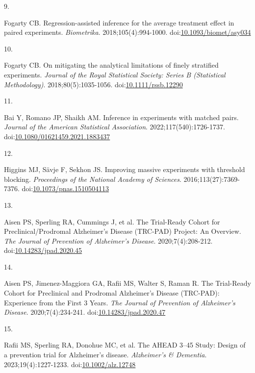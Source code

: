 \documentclass[
  11pt,
]{article}
\newlength{\cslhangindent}
\newlength{\csllabelwidth}
\newenvironment{CSLReferences}[2] %
 {\begin{list}{}{%
  \setlength{\itemindent}{0pt}
  \setlength{\leftmargin}{0pt}
  \setlength{\parsep}{0pt}
  \ifodd #1
   \setlength{\leftmargin}{\cslhangindent}
   \setlength{\itemindent}{-1\cslhangindent}
  \fi
  \setlength{\itemsep}{#2\baselineskip}}}
 {\end{list}}
\newcommand{\CSLLeftMargin}[1]{\parbox[t]{\csllabelwidth}{\strut#1\strut}}
\newcommand{\CSLRightInline}[1]{\parbox[t]{\linewidth - \csllabelwidth}{\strut#1\strut}}
\begin{document}
\begin{CSLReferences}{0}{1}
\CSLLeftMargin{9. }%
\CSLRightInline{Fogarty CB. Regression-assisted inference for the average treatment effect in paired experiments. \emph{Biometrika}. 2018;105(4):994-1000. doi:\href{https://doi.org/10.1093/biomet/asy034}{10.1093/biomet/asy034}}

\CSLLeftMargin{10. }%
\CSLRightInline{Fogarty CB. On mitigating the analytical limitations of finely stratified experiments. \emph{Journal of the Royal Statistical Society: Series B (Statistical Methodology)}. 2018;80(5):1035-1056. doi:\href{https://doi.org/10.1111/rssb.12290}{10.1111/rssb.12290}}

\CSLLeftMargin{11. }%
\CSLRightInline{Bai Y, Romano JP, Shaikh AM. Inference in experiments with matched pairs. \emph{Journal of the American Statistical Association}. 2022;117(540):1726-1737. doi:\href{https://doi.org/10.1080/01621459.2021.1883437}{10.1080/01621459.2021.1883437}}

\CSLLeftMargin{12. }%
\CSLRightInline{Higgins MJ, Sävje F, Sekhon JS. Improving massive experiments with threshold blocking. \emph{Proceedings of the National Academy of Sciences}. 2016;113(27):7369-7376. doi:\href{https://doi.org/10.1073/pnas.1510504113}{10.1073/pnas.1510504113}}

\CSLLeftMargin{13. }%
\CSLRightInline{Aisen PS, Sperling RA, Cummings J, et al. The {Trial-Ready Cohort} for {Preclinical}/{Prodromal Alzheimer}'s {Disease} ({TRC-PAD}) {Project}: {An Overview}. \emph{The Journal of Prevention of Alzheimer's Disease}. 2020;7(4):208-212. doi:\href{https://doi.org/10.14283/jpad.2020.45}{10.14283/jpad.2020.45}}

\CSLLeftMargin{14. }%
\CSLRightInline{Aisen PS, Jimenez-Maggiora GA, Rafii MS, Walter S, Raman R. The {Trial-Ready Cohort} for {Preclinical} and {Prodromal Alzheimer}'s {Disease} ({TRC-PAD}): {Experience} from the {First} 3 {Years}. \emph{The Journal of Prevention of Alzheimer's Disease}. 2020;7(4):234-241. doi:\href{https://doi.org/10.14283/jpad.2020.47}{10.14283/jpad.2020.47}}

\CSLLeftMargin{15. }%
\CSLRightInline{Rafii MS, Sperling RA, Donohue MC, et al. The {AHEAD} 3--45 {Study}: {Design} of a prevention trial for {Alzheimer}'s disease. \emph{Alzheimer's \& Dementia}. 2023;19(4):1227-1233. doi:\href{https://doi.org/10.1002/alz.12748}{10.1002/alz.12748}}


\end{CSLReferences}
\end{document}
